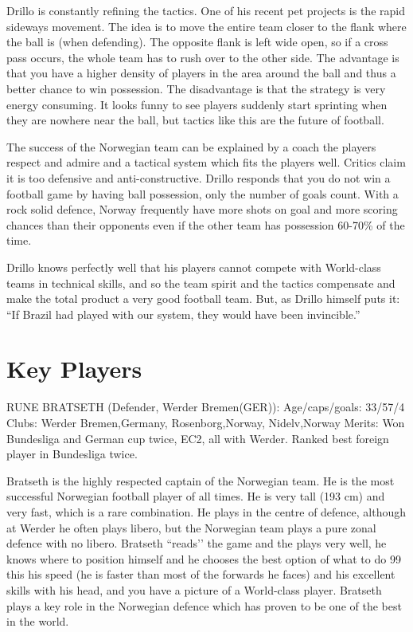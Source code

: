 Drillo is constantly refining the tactics. One of his recent pet projects is 
the rapid sideways movement. The idea is to move the entire team closer to the 
flank where the ball is (when defending). The opposite flank is left wide open, 
so if a cross pass occurs, the whole team has to rush over to the other side.  
The advantage is that you have a higher density of players in the area around 
the ball and thus a better chance to win possession. The disadvantage is that 
the strategy is very energy consuming. It looks funny to see players suddenly 
start sprinting when they are nowhere near the ball, but tactics like this are 
the future of football.

The success of the Norwegian team can be explained by a coach the players 
respect and admire and a tactical system which fits the players well. Critics 
claim it is too defensive and anti-constructive. Drillo responds that you do 
not win a football game by having ball possession, only the number of goals 
count. With a rock solid defence, Norway frequently have more shots on goal and 
more scoring chances than their opponents even if the other team has possession 
60-70\% of the time.

Drillo knows perfectly well that his players cannot compete with World-class 
teams in technical skills, and so the team spirit and the tactics compensate 
and make the total product a very good football team. But, as Drillo himself 
puts it: ``If Brazil had played with our system, they would have been invincible.''
\section{Key Players}
RUNE BRATSETH (Defender, Werder Bremen(GER)):
Age/caps/goals: 33/57/4
Clubs: Werder Bremen,Germany, Rosenborg,Norway, Nidelv,Norway
Merits: Won Bundesliga and German cup twice, EC2, all with Werder.
        Ranked best foreign player in Bundesliga twice.

Bratseth is the highly respected captain of the Norwegian team. He is the most 
successful Norwegian football player of all times. He is very tall (193 cm) and 
very fast, which is a rare combination. He plays in the centre of defence, 
although at Werder he often plays libero, but the Norwegian team plays a pure 
zonal defence with no libero. Bratseth ``reads’’ the game and the plays very well,
he knows where to position himself and he chooses the best option of what to do 
99%
this his speed (he is faster than most of the forwards he faces) and his 
excellent skills with his head, and you have a picture of a World-class player. 
Bratseth plays a key role in the Norwegian defence which has proven to be one 
of the best in the world.

